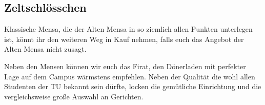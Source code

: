 \subsection*{Zeltschlösschen}
Klassische Mensa, die der Alten Mensa in so ziemlich allen Punkten unterlegen ist, könnt ihr den weiteren Weg in Kauf nehmen, falls euch das Angebot der Alten Mensa nicht zusagt.

Neben den Mensen können wir euch das Firat, den Dönerladen mit perfekter Lage auf dem Campus wärmstens empfehlen.
Neben der Qualität die wohl allen Studenten der TU bekannt sein dürfte, locken die gemütliche Einrichtung und die vergleichsweise große Auswahl an Gerichten.
